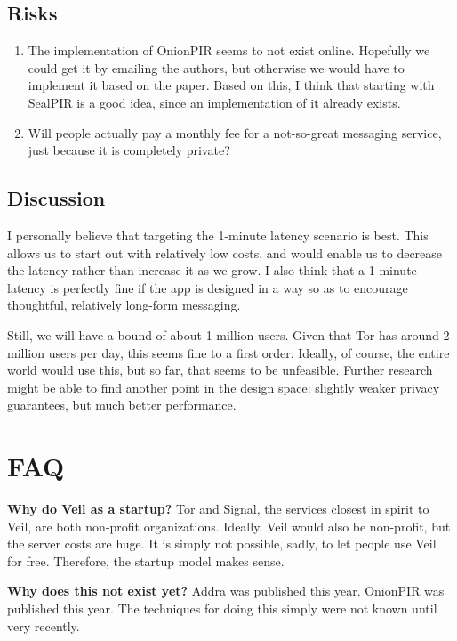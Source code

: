 \documentclass[sigconf, nonacm, balance=false, natbib=false, screen]{acmart}
\begin{document}
\subsection{Risks}

\begin{enumerate}
  \item The implementation of OnionPIR seems to not exist online. Hopefully we could get it by emailing the authors, but otherwise we would have to implement it based on the paper. Based on this, I think that starting with SealPIR is a good idea, since an implementation of it already exists.
  \item Will people actually pay a monthly fee for a not-so-great messaging service, just because it is completely private?
\end{enumerate}

\subsection{Discussion}

I personally believe that targeting the 1-minute latency scenario is best. This allows us to start out with relatively low costs, and would enable us to decrease the latency rather than increase it as we grow. I also think that a 1-minute latency is perfectly fine if the app is designed in a way so as to encourage thoughtful, relatively long-form messaging.

Still, we will have a bound of about 1 million users. Given that Tor has around 2 million users per day, this seems fine to a first order. Ideally, of course, the entire world would use this, but so far, that seems to be unfeasible. Further research might be able to find another point in the design space: slightly weaker privacy guarantees, but much better performance.

\section{FAQ}

\textbf{Why do Veil as a startup?} Tor and Signal, the services closest in spirit to Veil, are both non-profit organizations. Ideally, Veil would also be non-profit, but the server costs are huge. It is simply not possible, sadly, to let people use Veil for free. Therefore, the startup model makes sense.

\textbf{Why does this not exist yet?} Addra was published this year. OnionPIR was published this year. The techniques for doing this simply were not known until very recently.

\printbibliography
\end{document}
